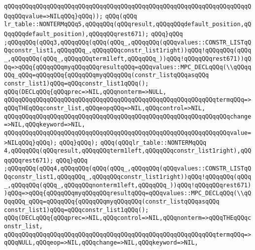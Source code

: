 \verb|qQQqqQQqqQQqqQQqqQQqqQQqqQQqqQQqqQQqqQQqqQQqqQQqqQQqqQQqqQQqqQQqqQQqqQQqqQQqvalue=>NILqQQq}qQQq));|\newline
\verb|qQQq(qQQq|\newline
\verb|lr_table::NONTERMqQQq5,qQQqqQQq(qQQqresult,qQQqqQQqdefault_position,qQQqqQQqdefault_position),qQQqqQQqrest671);|\newline
\verb|qQQq}qQQq|\newline
\verb|;qQQqqQQq(qQQq3,qQQqqQQq(qQQq(qQQq_,qQQqqQQq(qQQqvalues::CONSTR_LISTqQQqconstr_list1,qQQqqQQq_,qQQqqQQqconstr_list1right))qQQq!qQQqqQQq(qQQq_,qQQqqQQq(qQQq_,qQQqqQQqterm1left,qQQqqQQq_))qQQq!qQQqqQQqrest671))qQQq=>qQQq{qQQqqQQqmyqQQqqQQqresultqQQq=qQQqvalues::MPC_DECLqQQq(\\qQQqqQQq_qQQq=qQQqqQQq{qQQqqQQqmyqQQqqQQq(constr_listqQQqasqQQq|\newline
\verb|constr_list1)qQQq=qQQqconstr_list1qQQq();|\newline
\verb|qQQq(DECLqQQq{qQQqprec=>NIL,qQQqnonterm=>NULL,|\newline
\verb|qQQqqQQqqQQqqQQqqQQqqQQqqQQqqQQqqQQqqQQqqQQqqQQqqQQqqQQqqQQqtermqQQq=>qQQqTHEqQQqconstr_list,qQQqeopqQQq=>NIL,qQQqcontrol=>NIL,|\newline
\verb|qQQqqQQqqQQqqQQqqQQqqQQqqQQqqQQqqQQqqQQqqQQqqQQqqQQqqQQqqQQqqQQqchange=>NIL,qQQqkeyword=>NIL,|\newline
\verb|qQQqqQQqqQQqqQQqqQQqqQQqqQQqqQQqqQQqqQQqqQQqqQQqqQQqqQQqqQQqqQQqvalue=>NILqQQq}qQQq);|\newline
\verb|qQQq}qQQq);|\newline
\verb|qQQq(qQQqlr_table::NONTERMqQQq|\newline
\verb|4,qQQqqQQq(qQQqresult,qQQqqQQqterm1left,qQQqqQQqconstr_list1right),qQQqqQQqrest671);|\newline
\verb|qQQq}qQQq|\newline
\verb|;qQQqqQQq(qQQq4,qQQqqQQq(qQQq(qQQq_,qQQqqQQq(qQQqvalues::CONSTR_LISTqQQqconstr_list1,qQQqqQQq_,qQQqqQQqconstr_list1right))qQQq!qQQqqQQq(qQQq_,qQQqqQQq(qQQq_,qQQqqQQqnonterm1left,qQQqqQQq_))qQQq!qQQqqQQqrest671))qQQq=>qQQq{qQQqqQQqmyqQQqqQQqresultqQQq=qQQqvalues::MPC_DECLqQQq(\\qQQqqQQq_qQQq=qQQqqQQq{qQQqqQQqmyqQQqqQQq(constr_listqQQqasqQQq|\newline
\verb|constr_list1)qQQq=qQQqconstr_list1qQQq();|\newline
\verb|qQQq(DECLqQQq{qQQqprec=>NIL,qQQqcontrol=>NIL,qQQqnonterm=>qQQqTHEqQQqconstr_list,|\newline
\verb|qQQqqQQqqQQqqQQqqQQqqQQqqQQqqQQqqQQqqQQqqQQqqQQqqQQqqQQqqQQqtermqQQq=>qQQqNULL,qQQqeop=>NIL,qQQqchange=>NIL,qQQqkeyword=>NIL,|\newline
